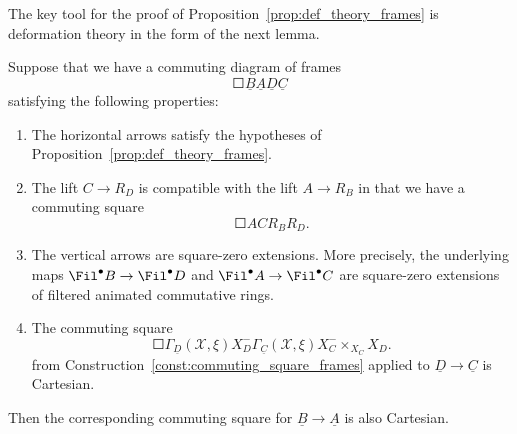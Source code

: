\documentclass[10pt]{amsart}
\begin{document}
The key tool for the proof of Proposition~\ref{prop:def_theory_frames} is deformation theory in the form of the next lemma.
\begin{lemma}
\label{lem:def_theory_for_prismatic_frames}
Suppose that we have a commuting diagram of frames
\[
\Square{\underline{B}}{}{\underline{A}}{}{}{\underline{D}}{}{\underline{C}}
\]
satisfying the following properties:
\begin{enumerate}
   \item The horizontal arrows satisfy the hypotheses of Proposition~\ref{prop:def_theory_frames}. 
   \item The lift $C\to R_D$ is compatible with the lift $A\to R_B$ in that we have a commuting square
   \[
   \Square{A}{}{C}{}{}{R_B}{}{R_D}.
   \]
   \item The vertical arrows are square-zero extensions. More precisely, the underlying maps $\Fil^\bullet B \to \Fil^\bullet D$ and $\Fil^\bullet A \to \Fil^\bullet C$ are square-zero extensions of filtered animated commutative rings.

   \item The commuting square 
   \[
\Square{\Gamma_{\underline{D}}(\mathcal{X},\xi)}{}{X^{-}_D}{}{}{\Gamma_{\underline{C}}(\mathcal{X},\xi)}{}{X^{-}_C\times_{X_C}X_D}.
\]
from Construction~\ref{const:commuting_square_frames} applied to $\underline{D}\to \underline{C}$ is Cartesian.
\end{enumerate}
Then the corresponding commuting square for $\underline{B}\to \underline{A}$ is also Cartesian.
\end{lemma}
\end{document}
